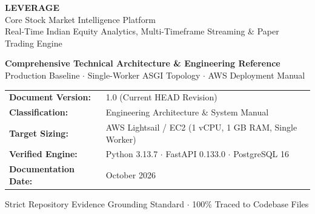 \documentclass[11pt,a4paper,oneside,openany]{report}
\begin{document}

\begin{titlepage}

\vspace{15mm}
\begin{center}
    {\Huge \sffamily \bfseries \color{white} LEVERAGE}\\[4mm]
    {\Large \sffamily \color{white!90} Core Stock Market Intelligence Platform}\\[2mm]
    {\normalsize \sffamily \color{white!80} Real-Time Indian Equity Analytics, Multi-Timeframe Streaming \& Paper Trading Engine}
\end{center}

\vspace{50mm}

\begin{center}
    {\large \sffamily \bfseries \color{navyblue} Comprehensive Technical Architecture \& Engineering Reference}\\[4mm]
    {\normalsize \sffamily \color{darkgray} Production Baseline $\cdot$ Single-Worker ASGI Topology $\cdot$ AWS Deployment Manual}\\[12mm]

    \begin{tcolorbox}[width=0.96\textwidth,colback=lightbg,colframe=bordergray,arc=2mm,boxrule=0.6pt]
    \centering\sffamily\small
    \begin{tabularx}{\linewidth}{p{40mm} Y}
        \textbf{Document Version:} & 1.0 (Current HEAD Revision) \\
        \textbf{Classification:} & Engineering Architecture \& System Manual \\
        \textbf{Target Sizing:} & AWS Lightsail / EC2 (1 vCPU, 1 GB RAM, Single Worker) \\
        \textbf{Verified Engine:} & Python 3.13.7 $\cdot$ FastAPI 0.133.0 $\cdot$ PostgreSQL 16 \\
        \textbf{Documentation Date:} & October 2026 \\
    \end{tabularx}
    \end{tcolorbox}
\end{center}

\vfill

\begin{center}
    \small \sffamily \color{darkgray}
    Strict Repository Evidence Grounding Standard $\cdot$ 100\% Traced to Codebase Files
\end{center}
\end{titlepage}
\end{document}
